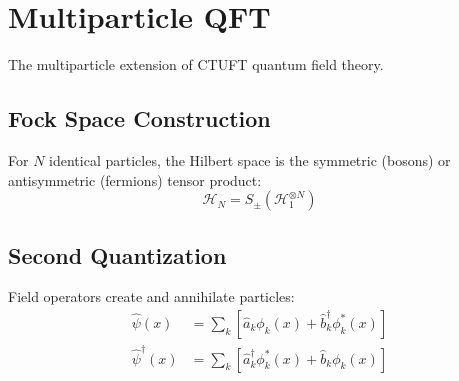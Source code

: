 \section{Multiparticle QFT}
\label{sec:multiparticle}

The multiparticle extension of CTUFT quantum field theory.

\subsection{Fock Space Construction}

For $N$ identical particles, the Hilbert space is the symmetric (bosons) or antisymmetric (fermions) tensor product:
\begin{equation}
\mathcal{H}_N = S_\pm (\mathcal{H}_1^{\otimes N})
\end{equation}

\subsection{Second Quantization}

Field operators create and annihilate particles:
\begin{align}
\hat{\psi}(x) &= \sum_k \left[ \hat{a}_k \phi_k(x) + \hat{b}^\dagger_k \phi_k^*(x) \right] \\
\hat{\psi}^\dagger(x) &= \sum_k \left[ \hat{a}^\dagger_k \phi_k^*(x) + \hat{b}_k \phi_k(x) \right]
\end{align}
